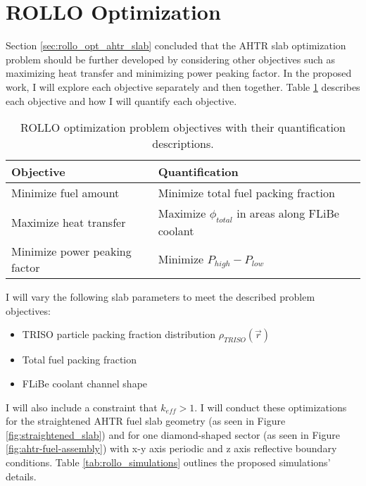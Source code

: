 \section{ROLLO Optimization}
Section \ref{sec:rollo_opt_ahtr_slab} concluded that the \gls{AHTR} slab 
optimization problem should be further developed by considering other objectives 
such as maximizing heat transfer and minimizing power peaking factor. 
In the proposed work, I will explore each objective separately and then together.
Table \ref{tab:objectives} describes each objective and how I will quantify 
each objective. 
\begin{table}[!htbp]
    \centering
    \onehalfspacing
    \caption{\acrfull{ROLLO} optimization problem objectives with their quantification 
    descriptions.}
	\label{tab:objectives}
    \footnotesize
    \begin{tabular}{p{5cm}p{7cm}}
    \hline 
    \textbf{Objective}& \textbf{Quantification}  \\
    \hline
    Minimize fuel amount & Minimize total fuel packing fraction \\ 
    Maximize heat transfer & Maximize $\phi_{total}$ in areas along FLiBe coolant \\
    Minimize power peaking factor & Minimize $P_{high}-P_{low}$ \\
    \hline
    \end{tabular}
\end{table}
I will vary the following slab parameters to meet the described problem objectives: 
\begin{itemize}
    \item \gls{TRISO} particle packing fraction distribution $\rho_{TRISO}(\vec{r})$
    \item Total fuel packing fraction
    \item \gls{FLiBe} coolant channel shape 
\end{itemize} 
I will also include a constraint that $k_{eff} > 1$.
I will conduct these optimizations for the straightened \gls{AHTR} fuel slab 
geometry (as seen in Figure \ref{fig:straightened_slab}) and for one 
diamond-shaped sector (as seen in Figure \ref{fig:ahtr-fuel-assembly}) with 
x-y axis periodic and z axis reflective boundary conditions. 
Table \ref{tab:rollo_simulations} outlines the proposed simulations' details. 
